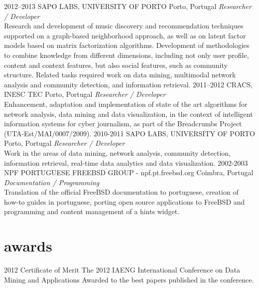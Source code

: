 \documentclass{friggeri-cv}
\begin{document}
\begin{entrylist}
\entry
{2012--2013}
{SAPO LABS, UNIVERSITY OF PORTO}
{Porto, Portugal}
{\emph{Researcher / Developer}\\
Research and development of music discovery and recommendation techniques supported on a graph-based neighborhood approach, as well as on latent factor models based on matrix factorization algorithms. Development of methodologies to combine knowledge from different dimensions, including not only user profile, content and context features, but also social features, such as community structure. Related tasks required work on data mining, multimodal network analysis and community detection, and information retrieval.}
\entry
{2011--2012}
{CRACS, INESC TEC}
{Porto, Portugal}
{\emph{Researcher / Developer}\\
Enhancement, adaptation and implementation of state of the art algorithms for network analysis, data mining and data visualization, in the context of intelligent information systems for cyber journalism, as part of the Breadcrumbs Project (UTA-Est/MAI/0007/2009).}
\entry
{2010-2011}
{SAPO LABS, UNIVERSITY OF PORTO}
{Porto, Portugal}
{\emph{Researcher / Developer}\\
Work in the areas of data mining, network analysis, community detection, information retrieval, real-time data analytics and data visualization.}
\entry
{2002-2003}
{NPF PORTUGUESE FREEBSD GROUP - npf.pt.freebsd.org}
{Coimbra, Portugal}
{\emph{Documentation / Programming}\\
Translation of the official FreeBSD documentation to portuguese, creation of how-to guides in portuguese, porting open source applications to FreeBSD and programming and content management of a hints widget.}
\end{entrylist}


\section{awards}

\begin{entrylist}
\entry
{2012}
{Certificate of Merit}
{The 2012 IAENG International Conference on Data Mining and Applications}
{Awarded to the best papers published in the conference.}
\end{entrylist}
\end{document}
